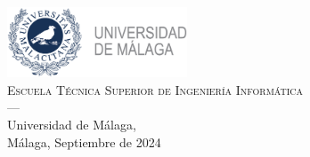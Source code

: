 \begin{titlepage}
\begin{minipage}{\textwidth}
\includegraphics[width=0.4\textwidth]{logos/MARCA UNIV. POSITIVA HORIZONTAL.png}\\[0.1cm]

\textsc{Escuela Técnica Superior de Ingeniería Informática}\\
\textsc{---}\\
Universidad de Málaga,\\
Málaga, Septiembre de 2024

\end{minipage}

\end{titlepage}